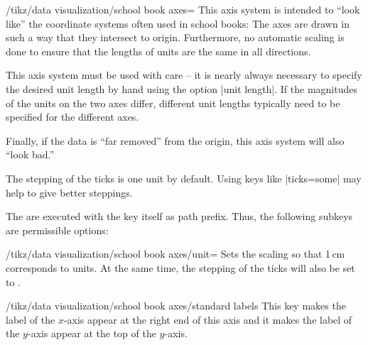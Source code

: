 \begin{key}{/tikz/data visualization/school book axes=}
  This axis system is intended to ``look like'' the coordinate systems
  often used in school books: The axes are drawn in such a way that
  they intersect to origin. Furthermore, no automatic
  scaling is done to ensure that the lengths of units are the same in
  all directions.

  This axis system must be used with care -- it is nearly always
  necessary to specify the desired unit length by hand using the
  option |unit length|. If the magnitudes of the units on the two axes
  differ, different unit lengths typically need to be specified for
  the different axes.

  Finally, if the data is ``far removed'' from the origin, this
  axis system will also ``look bad.''

\begin{codeexample}[]
\end{codeexample}

  The stepping of the ticks is one unit by default. Using keys like
  |ticks=some| may help to give better steppings.
  
  The  are executed with the key itself as path
  prefix. Thus, the following subkeys are permissible options:
  \begin{key}{/tikz/data visualization/school book axes/unit=}
    Sets the scaling so that 1\,cm corresponds to 
    units. At the same time, the stepping of the ticks will also be
    set to .
\begin{codeexample}[]
\end{codeexample}
  \end{key}

  \begin{key}{/tikz/data visualization/school book axes/standard labels}
    This key makes the label of the $x$-axis appear at the right end of
    this axis and it makes the label of the $y$-axis appear at the top
    of the $y$-axis.


\end{key}
\end{key}
